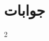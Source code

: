 \documentclass[leqno,b5paper]{book}
\begin{document}
\chapter*{جوابات}
\immediate\closeout\tempfile
\begin{multicols}{2}
{\small

}
\end{multicols}

\appendix
\renewcommand{\theequation}{\arabic{equation}}  %
%
%

%
%
%

\backmatter

\cleardoublepage
%
%


\renewcommand*{\indexname}{فرہنگ}      %
\cleardoublepage
{}

\printindex
\end{document}
